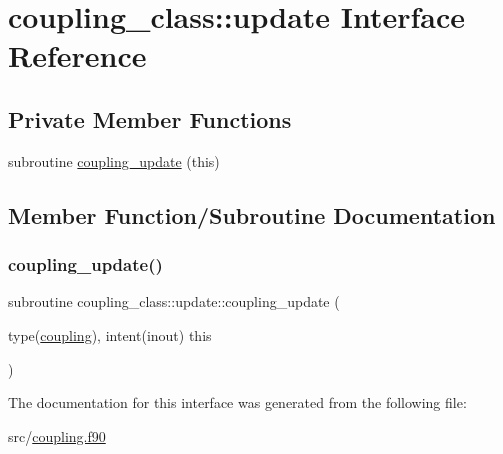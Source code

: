 \hypertarget{interfacecoupling__class_1_1update}{}\section{coupling\+\_\+class\+:\+:update Interface Reference}
\label{interfacecoupling__class_1_1update}
\subsection*{Private Member Functions}
\begin{DoxyCompactItemize}
\item 
subroutine \hyperlink{interfacecoupling__class_1_1update_a83178543e3c31dd4991544985e4c5f70}{coupling\+\_\+update} (this)
\end{DoxyCompactItemize}


\subsection{Member Function/\+Subroutine Documentation}
\mbox{\label{interfacecoupling__class_1_1update_a83178543e3c31dd4991544985e4c5f70}} 
\subsubsection{\texorpdfstring{coupling\+\_\+update()}{coupling\_update()}}
{\footnotesize\ttfamily subroutine coupling\+\_\+class\+::update\+::coupling\+\_\+update (\begin{DoxyParamCaption}\item[{type(\hyperlink{structcoupling__class_1_1coupling}{coupling}), intent(inout)}]{this }\end{DoxyParamCaption})\hspace{0.3cm}{\ttfamily [private]}}



The documentation for this interface was generated from the following file\+:\begin{DoxyCompactItemize}
\item 
src/\hyperlink{coupling_8f90}{coupling.\+f90}\end{DoxyCompactItemize}
